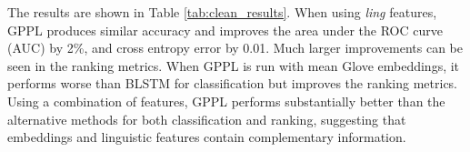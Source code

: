 
The results are shown in Table \ref{tab:clean_results}. When using \emph{ling} features,
GPPL produces similar accuracy and improves the area under the ROC curve (AUC) by 2\%,
and cross entropy error by 0.01. Much larger improvements can be seen in the ranking metrics. When GPPL is run with mean Glove embeddings, it performs worse than
BLSTM for classification but improves the ranking metrics. Using a combination of features,
GPPL performs substantially better than the alternative methods for both classification and
ranking, suggesting that embeddings and linguistic features contain complementary information.


